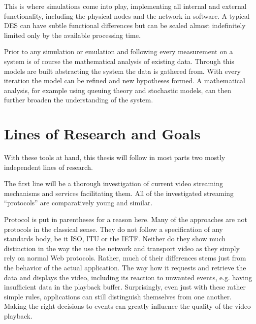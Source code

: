 This is where simulations come into play, implementing all internal and external functionality, including the physical nodes and the network in software. A typical \gls{DES} can have subtle functional differences but can be scaled almost indefinitely limited only by the available processing time. 

Prior to any simulation or emulation and following every measurement on a system is of course the mathematical analysis of existing data. Through this models are built abstracting the system the data is gathered from. With every iteration the model can be refined and new hypotheses formed.
A mathematical analysis, for example using queuing theory and stochastic models, can then further broaden the understanding of the system.




\section{Lines of Research and Goals}

With these tools at hand, this thesis will follow in most parts two mostly independent lines of research.

The first line will be a thorough investigation of current video streaming mechanisms and services facilitating them. All of the investigated streaming ``protocols'' are comparatively young and similar. 

Protocol is put in parentheses for a reason here. Many of the approaches are not protocols in the classical sense. They do not follow a specification of any standards body, be it \gls{ISO}, \gls{ITU} or the \gls{IETF}. Neither do they show much distinction in the way the use the network and transport video as they simply rely on normal Web protocols. Rather, much of their differences stems just from the behavior of the actual application. The way how it requests and retrieve the data and displays the video, including its reaction to unwanted events, e.g. having insufficient data in the playback buffer. 
Surprisingly, even just with these rather simple rules, applications can still distinguish themselves from one another. Making the right decisions to events can greatly influence the quality of the video playback. 

